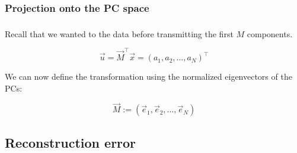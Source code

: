 \subsubsection{Projection onto the PC space}

\begin{frame}\frametitle{\subsubsecname}

Recall that we wanted to the data before transmitting the first $M$ components.


\begin{equation}
\vec u = \vec M^\top \vec x = (a_1,a_2,\ldots,a_N)^\top
\end{equation}


We can now define the transformation using the normalized eigenvectors of the PCs:

\begin{equation}
\vec M := (\vec e_1, \vec e_2, \ldots,\vec e_N)
\end{equation}



\end{frame}

\subsection{Reconstruction error}

